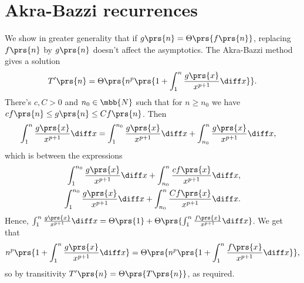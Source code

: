 \documentclass[oneside]{scrbook}
\theoremstyle{definition}
\begin{document}
\section{Akra-Bazzi recurrences}

\begin{exercise}\label{exercise:akra-bazzi-driving-asymptotics}
We show in greater generality that if $g\prs{n} = \Theta\prs{f\prs{n}}$, replacing $f\prs{n}$ by $g\prs{n}$ doesn't affect the asymptotics.
The Akra-Bazzi method gives a solution
\begin{align*}
T'\prs{n} = \Theta\prs{n^p \prs{1 + \int_1^n \frac{g\prs{x}}{x^{p+1}} \diff x}} \text{.}
\end{align*}
There's $c, C > 0$ and $n_0 \in \mbb{N}$ such that for $n \geq n_0$ we have $c f\prs{n} \leq g\prs{n} \leq C f\prs{n}$. Then
\begin{align*}
\int_1^n \frac{g\prs{x}}{x^{p+1}} \diff x &= \int_1^{n_0} \frac{g\prs{x}}{x^{p+1}} \diff x + \int_{n_0}^n \frac{g\prs{x}}{x^{p+1}} \diff x \text{,}
\end{align*}
which is between the expressions
\begin{align*}
\int_1^{n_0} \frac{g\prs{x}}{x^{p+1}} \diff x + \int_{n_0}^n \frac{cf\prs{x}}{x^{p+1}} \diff x \text{,} \\
\int_1^{n_0} \frac{g\prs{x}}{x^{p+1}} \diff x + \int_{n_0}^n \frac{Cf\prs{x}}{x^{p+1}} \diff x \text{.}
\end{align*}
Hence,
$\int_1^n \frac{g\prs{x}}{x^{p+1}} \diff x = \Theta\prs{1} + \Theta\prs{\int_1^n \frac{f\prs{x}}{x^{p+1}} \diff x}$. We get that
\[n^p\prs{1 + \int_1^n \frac{g\prs{x}}{x^{p+1}} \diff x} = \Theta\prs{n^p \prs{1 + \int_1^n \frac{f\prs{x}}{x^{p+1}} \diff x}} \text{,}\]
so by transitivity $T'\prs{n} = \Theta\prs{T\prs{n}}$, as required.
\end{exercise}
\end{document}
